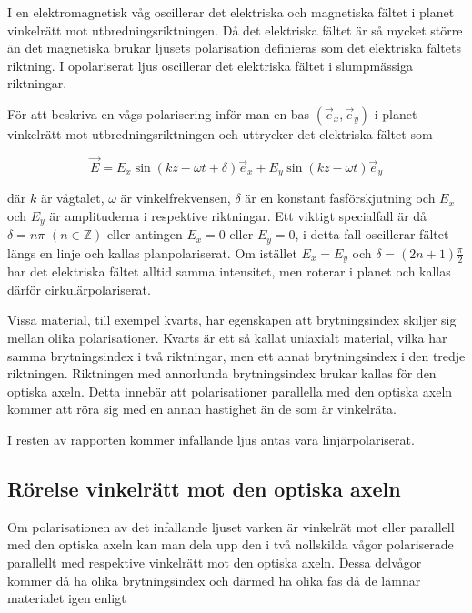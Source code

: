 \documentclass[a4paper]{article}
\begin{document}
I en elektromagnetisk våg oscillerar det elektriska och magnetiska fältet i planet vinkelrätt mot utbredningsriktningen. Då det elektriska fältet är så mycket större än det magnetiska brukar ljusets polarisation definieras som det elektriska fältets riktning. I opolariserat ljus oscillerar det elektriska fältet i slumpmässiga riktningar. \cite[pp.~146--148]{pearsonIntroOpt}

För att beskriva en vågs polarisering inför man en bas $(\vec e_x, \vec e_y)$ i planet vinkelrätt mot utbredningsriktningen och uttrycker det elektriska fältet som \cite{labManual}

\begin{equation}
	\vec E = E_x \sin\left(k z - \omega t + \delta\right) \vec e_x + E_y \sin\left(k z - \omega t\right) \vec e_y
\end{equation}

där $k$ är vågtalet, $\omega$ är vinkelfrekvensen, $\delta$ är en konstant fasförskjutning och $E_x$ och $E_y$ är amplituderna i respektive riktningar. Ett viktigt specialfall är då $\delta = n\pi \,\, \left(n \in \mathbb{Z}\right)$ eller antingen $E_x=0$ eller $E_y=0$, i detta fall oscillerar fältet längs en linje och kallas planpolariserat. Om istället $E_x=E_y$ och $\delta = \left(2 n + 1\right)\frac{\pi}{2}$ har det elektriska fältet alltid samma intensitet, men roterar i planet och kallas därför cirkulärpolariserat. \cite{labManual}\cite[p.~147]{pearsonIntroOpt}

Vissa material, till exempel kvarts, har egenskapen att brytningsindex skiljer sig mellan olika polarisationer. Kvarts är ett så kallat uniaxialt material, vilka har samma brytningsindex i två riktningar, men ett annat brytningsindex i den tredje riktningen. Riktningen med annorlunda brytningsindex brukar kallas för den optiska axeln. Detta innebär att polarisationer parallella med den optiska axeln kommer att röra sig med en annan hastighet än de som är vinkelräta.\cite{labManual}\cite[pp.~382--383]{pearsonIntroOpt}

I resten av rapporten kommer infallande ljus antas vara linjärpolariserat.

\subsection{Rörelse vinkelrätt mot den optiska axeln}

Om polarisationen av det infallande ljuset varken är vinkelrät mot eller parallell med den optiska axeln kan man dela upp den i två nollskilda vågor polariserade parallellt med respektive vinkelrätt mot den optiska axeln. Dessa delvågor kommer då ha olika brytningsindex och därmed ha olika fas då de lämnar materialet igen enligt \cite{labManual}
\end{document}
